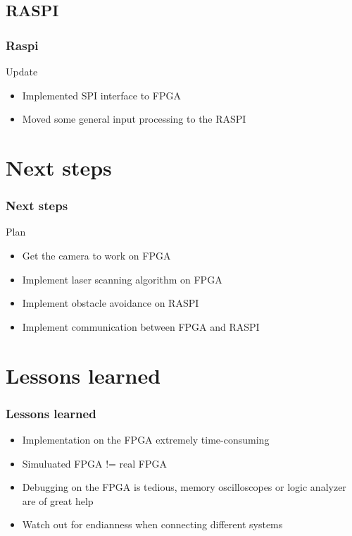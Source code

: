 \documentclass[pdf]{beamer}
\begin{document}
\subsection{RASPI}
\begin{frame}
\frametitle{Raspi}
\begin{exampleblock}{Update}
\begin{itemize}
  \item Implemented SPI interface to FPGA
  \item Moved some general input processing to the RASPI
\end{itemize}
\end{exampleblock}
\end{frame}

\section{Next steps}
\begin{frame}
\frametitle{Next steps}
\begin{exampleblock}{Plan}
\begin{itemize}
\item Get the camera to work on FPGA 
\item Implement laser scanning algorithm on FPGA
\item Implement obstacle avoidance on RASPI
\item Implement communication between FPGA and RASPI
\end{itemize}
\end{exampleblock}
\end{frame}

\section{Lessons learned}
\begin{frame}
\frametitle{Lessons learned}
\begin{exampleblock}{}
\begin{itemize}
\item Implementation on the FPGA extremely time-consuming
\item Simuluated FPGA != real FPGA
\item Debugging on the FPGA is tedious, memory oscilloscopes or logic analyzer are of great help  
\item Watch out for endianness when connecting different systems
\end{itemize}
\end{exampleblock}
\end{frame}
\end{document}
